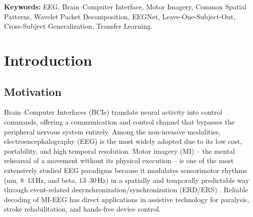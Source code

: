 \documentclass[11pt,a4paper]{article}
\begin{document}
\vspace{0.5cm}
\noindent\textbf{Keywords:} EEG, Brain--Computer Interface, Motor Imagery, Common Spatial Patterns,
Wavelet Packet Decomposition, EEGNet, Leave-One-Subject-Out, Cross-Subject Generalization, Transfer Learning.

\newpage
\tableofcontents
\newpage

\section{Introduction}

\subsection{Motivation}
Brain--Computer Interfaces (BCIs) translate neural activity into control commands, offering a
communication and control channel that bypasses the peripheral nervous system entirely. Among the
non-invasive modalities, electroencephalography (EEG) is the most widely adopted due to its low cost,
portability, and high temporal resolution. Motor imagery (MI) -- the mental rehearsal of a movement
without its physical execution -- is one of the most extensively studied EEG paradigms because it
modulates sensorimotor rhythms (mu, 8--13\,Hz, and beta, 13--30\,Hz) in a spatially and temporally
predictable way through event-related desynchronization/synchronization (ERD/ERS)
\cite{pfurtscheller1999}. Reliable decoding of MI-EEG has direct applications in assistive
technology for paralysis, stroke rehabilitation, and hands-free device control.
\end{document}
